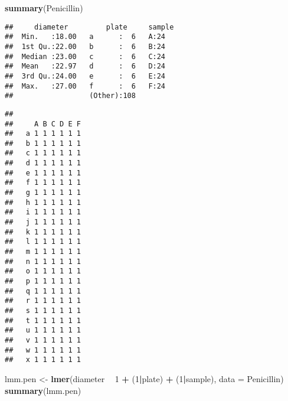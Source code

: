 \documentclass[
]{book}
\newenvironment{Shaded}{\begin{snugshade}}{\end{snugshade}}
\newcommand{\CommentTok}[1]{\textcolor[rgb]{0.56,0.35,0.01}{\textit{#1}}}
\newcommand{\DataTypeTok}[1]{\textcolor[rgb]{0.13,0.29,0.53}{#1}}
\newcommand{\DecValTok}[1]{\textcolor[rgb]{0.00,0.00,0.81}{#1}}
\newcommand{\KeywordTok}[1]{\textcolor[rgb]{0.13,0.29,0.53}{\textbf{#1}}}
\newcommand{\NormalTok}[1]{#1}
\newcommand{\OperatorTok}[1]{\textcolor[rgb]{0.81,0.36,0.00}{\textbf{#1}}}
\newcommand{\StringTok}[1]{\textcolor[rgb]{0.31,0.60,0.02}{#1}}
\begin{document}
\begin{Shaded}
\begin{Highlighting}[]
\KeywordTok{summary}\NormalTok{(Penicillin)}
\end{Highlighting}
\end{Shaded}

\begin{verbatim}
##     diameter         plate     sample
##  Min.   :18.00   a      :  6   A:24  
##  1st Qu.:22.00   b      :  6   B:24  
##  Median :23.00   c      :  6   C:24  
##  Mean   :22.97   d      :  6   D:24  
##  3rd Qu.:24.00   e      :  6   E:24  
##  Max.   :27.00   f      :  6   F:24  
##                  (Other):108
\end{verbatim}

\begin{Shaded}
\end{Shaded}

\begin{verbatim}
##    
##     A B C D E F
##   a 1 1 1 1 1 1
##   b 1 1 1 1 1 1
##   c 1 1 1 1 1 1
##   d 1 1 1 1 1 1
##   e 1 1 1 1 1 1
##   f 1 1 1 1 1 1
##   g 1 1 1 1 1 1
##   h 1 1 1 1 1 1
##   i 1 1 1 1 1 1
##   j 1 1 1 1 1 1
##   k 1 1 1 1 1 1
##   l 1 1 1 1 1 1
##   m 1 1 1 1 1 1
##   n 1 1 1 1 1 1
##   o 1 1 1 1 1 1
##   p 1 1 1 1 1 1
##   q 1 1 1 1 1 1
##   r 1 1 1 1 1 1
##   s 1 1 1 1 1 1
##   t 1 1 1 1 1 1
##   u 1 1 1 1 1 1
##   v 1 1 1 1 1 1
##   w 1 1 1 1 1 1
##   x 1 1 1 1 1 1
\end{verbatim}

\begin{Shaded}
\begin{Highlighting}[]
\NormalTok{lmm.pen <-}\StringTok{ }\KeywordTok{lmer}\NormalTok{(diameter }\OperatorTok{~}\StringTok{ }\DecValTok{1} \OperatorTok{+}\StringTok{ }\NormalTok{(}\DecValTok{1}\OperatorTok{|}\NormalTok{plate) }\OperatorTok{+}\StringTok{ }\NormalTok{(}\DecValTok{1}\OperatorTok{|}\NormalTok{sample), }\DataTypeTok{data =}\NormalTok{ Penicillin)}
\KeywordTok{summary}\NormalTok{(lmm.pen)}
\end{Highlighting}
\end{Shaded}
\end{document}
